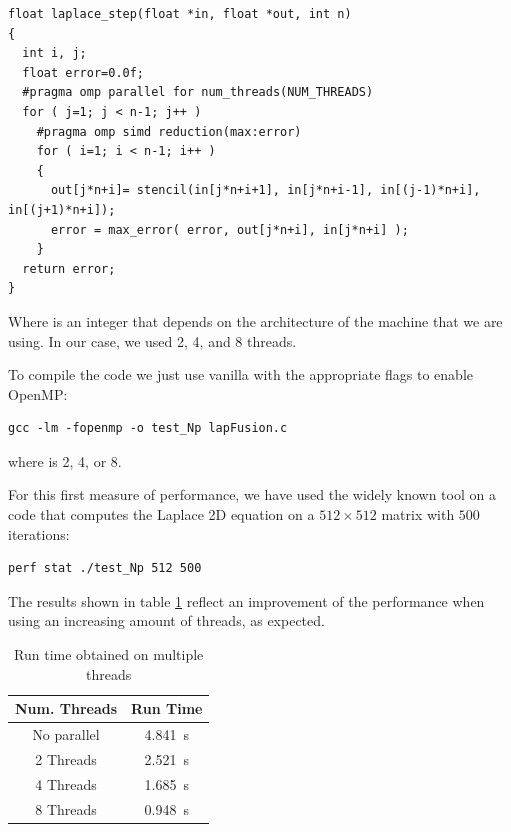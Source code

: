 \begin{lstlisting}[firstnumber=17, label=sn:omp, caption= Example of parallelisation on nested loops using OpenMP]
float laplace_step(float *in, float *out, int n)
{
  int i, j;
  float error=0.0f;
  #pragma omp parallel for num_threads(NUM_THREADS)
  for ( j=1; j < n-1; j++ )
    #pragma omp simd reduction(max:error)
    for ( i=1; i < n-1; i++ )
    {
      out[j*n+i]= stencil(in[j*n+i+1], in[j*n+i-1], in[(j-1)*n+i], in[(j+1)*n+i]);
      error = max_error( error, out[j*n+i], in[j*n+i] );
    }
  return error;
}
\end{lstlisting}

Where  is an integer that depends on the architecture of the machine that we are using. In our case, we used 2, 4, and 8 threads.

To compile the code we just use vanilla  with the appropriate flags to enable OpenMP:
\begin{lstlisting}
gcc -lm -fopenmp -o test_Np lapFusion.c
\end{lstlisting}
where  is 2, 4, or 8.

For this first measure of performance, we have used the widely known tool  on a code that computes the Laplace 2D equation on a $512 \times 512$ matrix with $500$ iterations:

\begin{lstlisting}
perf stat ./test_Np 512 500
\end{lstlisting}

\bigskip
The results shown in table \ref{tab:perf-stat} reflect an improvement of the performance when using an increasing amount of threads, as expected.

\begin{table}[H]
\centering
\begin{tabular}{c c}
    \toprule
    \toprule
    \textbf{Num. Threads} & \textbf{Run Time} \\
    \midrule
    No parallel           & \SI{4.841}{\s}    \\
    2 Threads             & \SI{2.521}{\s}    \\
    4 Threads             & \SI{1.685}{\s}    \\
    8 Threads             & \SI{0.948}{\s}    \\
    \bottomrule
\end{tabular}
\caption{Run time obtained on multiple threads}
\label{tab:perf-stat}
\end{table}

